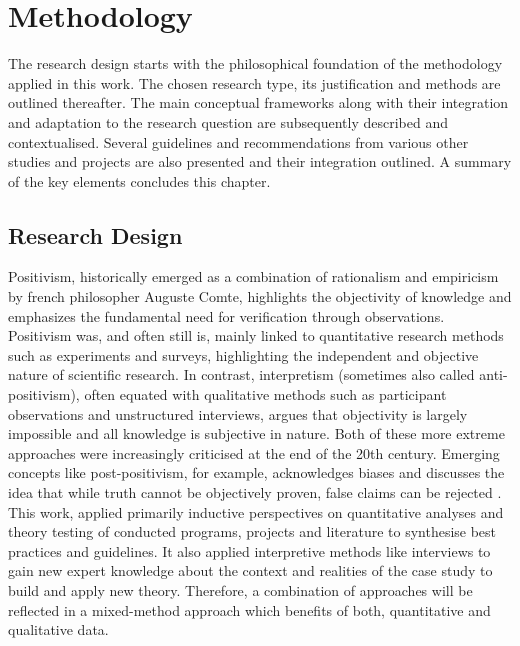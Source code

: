 
\chapter{Methodology} %

\label{chap3:methodology} %

The research design starts with the philosophical foundation of the methodology applied in this work. The chosen research type, its justification and methods are outlined thereafter. The main conceptual frameworks along with their integration and adaptation to the research question are subsequently described and contextualised. Several guidelines and recommendations from various other studies and projects are also presented and their integration outlined. A summary of the key elements concludes this chapter.   

\section{Research Design} %

Positivism, historically emerged as a combination of rationalism and empiricism by french philosopher Auguste Comte, highlights the objectivity of knowledge and emphasizes the fundamental need for verification through observations. Positivism was, and often still is, mainly linked to quantitative research methods such as experiments and surveys, highlighting the independent and objective nature of scientific research. In contrast, interpretism (sometimes also called anti-positivism), often equated with qualitative methods such as participant observations and unstructured interviews, argues that objectivity is largely impossible and all knowledge is subjective in nature. Both of these more extreme approaches were increasingly criticised at the end of the 20th century. Emerging concepts like post-positivism, for example, acknowledges biases and discusses the idea that while truth cannot be objectively proven, false claims can be rejected \autocite{pelzResearchMethodsSocial,trochimResearchMethodsKnowledge2001}.\newline
This work, applied primarily inductive perspectives on quantitative analyses and theory testing of conducted programs, projects and literature to synthesise best practices and guidelines. It also applied interpretive methods like interviews to gain new expert knowledge about the context and realities of the case study to build and apply new theory. Therefore, a combination of approaches will be reflected in a mixed-method approach which benefits of both, quantitative and qualitative data.

